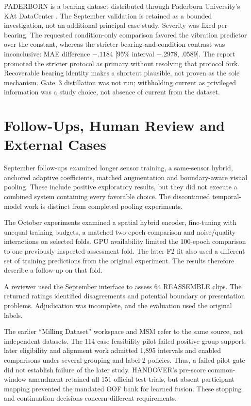 PADERBORN is a bearing dataset distributed through Paderborn University's KAt DataCenter
\parencite{Lessmeier2016Paderborn,PaderbornKAtDataCenter}. The September validation is
retained as a bounded investigation, not an additional principal case study. Severity was
fixed per bearing. The requested
condition-only comparison favored the vibration predictor over the constant, whereas the
stricter bearing-and-condition contrast was inconclusive: MAE difference $-.1184$ [95\%
interval $-.2978$, .0589]. The report promoted the stricter protocol as primary without
resolving that protocol fork. Recoverable bearing identity makes a shortcut plausible,
not proven as the sole mechanism. Gate~3 distillation was not run; withholding current
as privileged information was a study choice, not absence of current from the
dataset.

\section{Follow-Ups, Human Review and External Cases}
September follow-ups examined longer sensor training, a same-sensor hybrid, anchored
adaptive coefficients, matched augmentation and boundary-aware visual pooling. These
include positive exploratory results, but they did not execute a combined system
containing every favorable choice. The discontinued temporal-model work is distinct from
completed pooling experiments.

The October experiments examined a spatial hybrid encoder, fine-tuning with unequal
training budgets, a matched two-epoch comparison and noise/quality interactions on
selected folds. GPU availability limited the 100-epoch comparison to one previously
inspected assessment fold. The later F2 fit also used a different set of training
predictions from the original experiment. The results therefore describe a follow-up on
that fold.

A reviewer used the September interface to assess 64 REASSEMBLE clips. The returned
ratings identified disagreements and potential boundary or presentation problems.
Adjudication was incomplete, and the evaluation used the original labels.

The earlier \enquote{Milling Dataset} workspace and MSM refer to the same source, not
independent datasets. The 114-case feasibility pilot failed positive-group support;
later eligibility and alignment work admitted 1,895 intervals and enabled comparisons
under several grouping and label-2 policies. Thus, a failed pilot gate did not establish
failure of the later study. HANDOVER's pre-score common-window amendment retained all
151 official test trials, but absent participant mapping prevented the mandated OOF bank
for learned fusion. These stopping and continuation decisions concern different
requirements.

